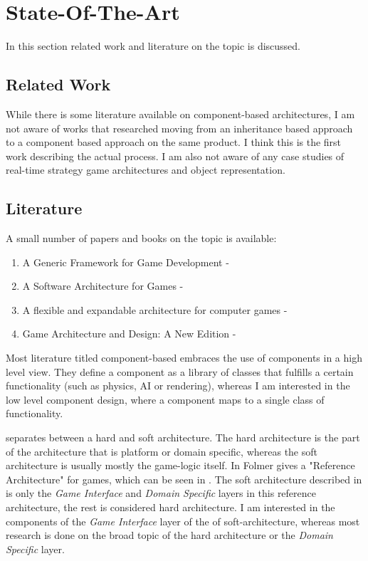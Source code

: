 \section{State-Of-The-Art}
In this section related work and literature on the topic is discussed.

\subsection{Related Work}
While there is some literature available on component-based architectures, I am not aware of works that researched
moving from an inheritance based approach to a component based approach on the same product. I think this is the first
work describing the actual process. I am also not aware of any case studies of \OS{} real-time strategy game
architectures and object representation.

\subsection{Literature}
A small number of papers and books on the topic is available:
\begin{enumerate}
    \item A Generic Framework for Game Development - \cite{Fh02ageneric}
    \item A Software Architecture for Games - \cite{Doherty_2003}
    \item A flexible and expandable architecture for computer games - \cite{Plummer_2004}
    \item Game Architecture and Design: A New Edition - \cite{Rollings.2003}
\end{enumerate}

Most literature titled component-based embraces the use of components in a high level view. They define a component
as a library of classes that fulfills a certain functionality (such as physics, AI or rendering), whereas I am
interested in the low level component design, where a component maps to a single class of functionality.

\cite{Rollings.2003} separates between a hard and soft architecture. The hard architecture is the part of the
architecture that is platform or domain specific, whereas the soft architecture is usually mostly the game-logic itself.
In \cite{springerlink:10.1007/978-3-540-73551-95} Folmer gives a "Reference Architecture" for games, which can be seen in
. The soft architecture described in \cite{Rollings.2003} is only the \textit{Game Interface}
and \textit{Domain Specific} layers in this reference architecture, the rest is considered hard architecture. I am
interested in the components of the \textit{Game Interface} layer of the of soft-architecture, whereas most
research is done on the broad topic of the hard architecture or the \textit{Domain Specific} layer.


